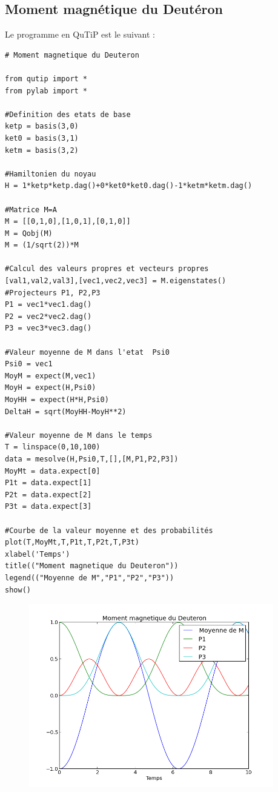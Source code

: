 \documentclass[a4paper,12pt]{book}
\numberwithin{equation}{section}
\begin{document}
\subsection{Moment magnétique du Deutéron}
Le programme en QuTiP est le suivant :
\begin{lstlisting}
# Moment magnetique du Deuteron

from qutip import *
from pylab import *

#Definition des etats de base
ketp = basis(3,0)
ket0 = basis(3,1)
ketm = basis(3,2)

#Hamiltonien du noyau
H = 1*ketp*ketp.dag()+0*ket0*ket0.dag()-1*ketm*ketm.dag()

#Matrice M=A
M = [[0,1,0],[1,0,1],[0,1,0]]
M = Qobj(M)
M = (1/sqrt(2))*M

#Calcul des valeurs propres et vecteurs propres
[val1,val2,val3],[vec1,vec2,vec3] = M.eigenstates()
#Projecteurs P1, P2,P3
P1 = vec1*vec1.dag()
P2 = vec2*vec2.dag()
P3 = vec3*vec3.dag()

#Valeur moyenne de M dans l'etat  Psi0
Psi0 = vec1
MoyM = expect(M,vec1)
MoyH = expect(H,Psi0)
MoyHH = expect(H*H,Psi0)
DeltaH = sqrt(MoyHH-MoyH**2)

#Valeur moyenne de M dans le temps
T = linspace(0,10,100)
data = mesolve(H,Psi0,T,[],[M,P1,P2,P3])
MoyMt = data.expect[0]
P1t = data.expect[1]
P2t = data.expect[2]
P3t = data.expect[3]

#Courbe de la valeur moyenne et des probabilités
plot(T,MoyMt,T,P1t,T,P2t,T,P3t)
xlabel('Temps')
title(("Moment magnetique du Deuteron"))
legend(("Moyenne de M","P1","P2","P3"))
show()

\end{lstlisting}

\begin{figure}[!h]
\begin{center}
\includegraphics[height=8cm]{graphics/NoyauDeuteron.png}
\end{center}
\end{figure}
\end{document}

